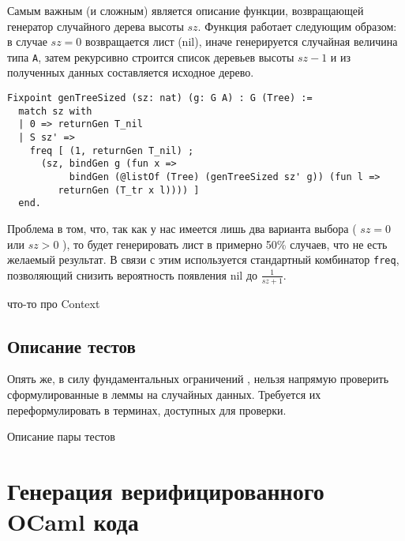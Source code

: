 Самым важным (и сложным) является описание функции, возвращающей генератор случайного дерева высоты $sz$. Функция работает следующим образом: в случае $sz  = 0$ возвращается лист (nil), иначе генерируется случайная величина типа \texttt{A}, затем рекурсивно строится список деревьев высоты $sz - 1$ и из полученных данных составляется исходное дерево.

\begin{lstlisting}
Fixpoint genTreeSized (sz: nat) (g: G A) : G (Tree) :=
  match sz with
  | 0 => returnGen T_nil
  | S sz' =>
    freq [ (1, returnGen T_nil) ;
      (sz, bindGen g (fun x =>
           bindGen (@listOf (Tree) (genTreeSized sz' g)) (fun l =>
         returnGen (T_tr x l)))) ]
  end.
\end{lstlisting}

Проблема в том, что, так как у нас имеется лишь два варианта выбора ( $sz = 0$ или $sz > 0$ ), то \tqc будет генерировать лист в примерно 50\% случаев, что не есть желаемый результат. В связи с этим используется стандартный комбинатор \texttt{freq}, позволяющий снизить вероятность появления nil до $\frac{1}{sz + 1}$.

что-то про Context

\subsection{Описание тестов}

Опять же, в силу фундаментальных ограничений \tqc, нельзя напрямую проверить сформулированные в \tcoq леммы на случайных данных. Требуется их переформулировать в терминах, доступных для проверки.

Описание пары тестов

\section{Генерация верифицированного OCaml кода}

\Conc

\printbibliography[%
    heading=bibintoc%
]

\appendix
{}

